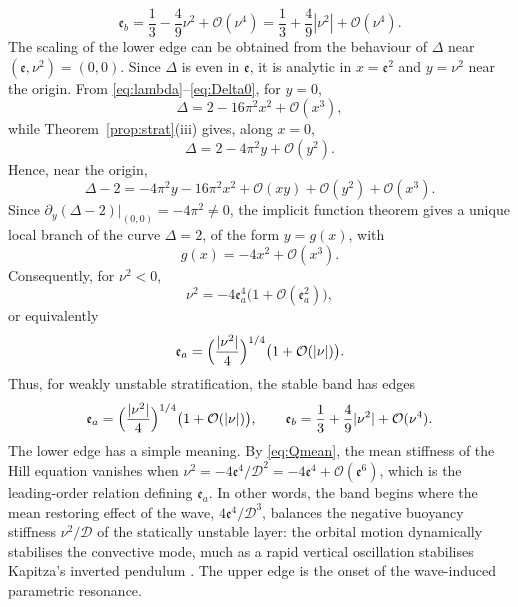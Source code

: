 \documentclass[reqno]{amsart}
\newcommand{\D}{\mathcal{D}}
\newcommand{\ee}{\mathfrak{e}}
\begin{document}
$$
\ee_b=\frac13-\frac49\nu^2+\mathcal{O}(\nu^4)
=\frac13+\frac49|\nu^2|+\mathcal{O}(\nu^4).
$$
The scaling of the lower edge can be obtained from the behaviour of $\Delta$ near $(\ee,\nu^2)=(0,0)$. Since $\Delta$ is even in $\ee$, it is analytic in $x=\ee^2$ and $y=\nu^2$ near the origin. From \eqref{eq:lambda}--\eqref{eq:Delta0}, for $y=0$,
$$
\Delta=2-16\pi^2x^2+\mathcal{O}(x^3),
$$
while Theorem~\ref{prop:strat}(iii) gives, along $x=0$,
$$
\Delta=2-4\pi^2y+\mathcal{O}(y^2).
$$
Hence, near the origin,
$$
\Delta-2=-4\pi^2y-16\pi^2x^2
+\mathcal{O}(xy)+\mathcal{O}(y^2)+\mathcal{O}(x^3).
$$
Since $\partial_y(\Delta-2)|_{(0,0)}=-4\pi^2\neq0$, the implicit function theorem gives a unique local branch of the curve $\Delta=2$, of the form $y=g(x)$, with
$$
g(x)=-4x^2+\mathcal{O}(x^3).
$$
Consequently, for $\nu^2<0$,
$$
\nu^2=-4\ee_a^4\bigl(1+\mathcal{O}(\ee_a^2)\bigr),
$$
or equivalently
$$
\ee_a=\Bigl(\frac{|\nu^2|}{4}\Bigr)^{1/4}
\bigl(1+\mathcal{O}(|\nu|)\bigr).
$$
Thus, for weakly unstable stratification, the stable band has edges
$$
\ee_a=\Bigl(\frac{|\nu^2|}{4}\Bigr)^{1/4}
\bigl(1+\mathcal{O}(|\nu|)\bigr),
\qquad
\ee_b=\frac13+\frac49|\nu^2|+\mathcal{O}(\nu^4).
$$
The lower edge has a simple meaning. By \eqref{eq:Qmean}, the mean stiffness of the Hill equation vanishes when $\nu^2=-4\ee^4/\D^2=-4\ee^4+\mathcal{O}(\ee^6)$, which is the leading-order relation defining $\ee_a$. In other words, the band begins where the mean restoring effect of the wave, $4\ee^4/\D^3$, balances the negative buoyancy stiffness $\nu^2/\D$ of the statically unstable layer: the orbital motion dynamically stabilises the convective mode, much as a rapid vertical oscillation stabilises Kapitza's inverted pendulum \cite{Kapitza1951,LeviWeckesser1995}. The upper edge is the onset of the wave-induced parametric resonance.





%
\end{document}
